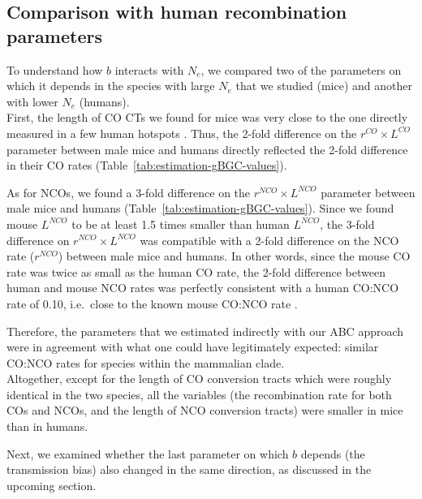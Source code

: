 \subsection{Comparison with human recombination parameters}

To understand how $b$ interacts with $N_e$, we compared two of the parameters on which it depends in the species with large $N_e$ that we studied (mice) and another with lower $N_e$ (humans).\\

First, the length of CO CTs we found for mice was very close to the one directly measured in a few human hotspots \citep{jeffreys2004intense}.
Thus, the 2-fold difference on the $r^{CO} \times L^{CO}$ parameter between male mice and humans directly reflected the 2-fold difference in their CO rates (Table~\ref{tab:estimation-gBGC-values}).


As for NCOs, we found a 3-fold difference on the $r^{NCO} \times L^{NCO}$ parameter between male mice and humans (Table~\ref{tab:estimation-gBGC-values}).
Since we found mouse $L^{NCO}$ to be at least 1.5 times smaller than human $L^{NCO}$, the 3-fold difference on $r^{NCO} \times L^{NCO}$ was compatible with a 2-fold difference on the NCO rate ($r^{NCO}$) between male mice and humans. 
In other words, since the mouse CO rate was twice as small as the human CO rate, the 2-fold difference between human and mouse NCO rates was perfectly consistent with a human CO:NCO rate of 0.10, i.e.\ close to the known mouse CO:NCO rate \citep{cole2010comprehensive}.

Therefore, the parameters that we estimated indirectly with our ABC approach were in agreement with what one could have legitimately expected: similar CO:NCO rates for species within the mammalian clade.\\


Altogether, except for the length of CO conversion tracts which were roughly identical in the two species, all the variables (the recombination rate for both COs and NCOs, and the length of NCO conversion tracts) were smaller in mice than in humans.

Next, we examined whether the last parameter on which $b$ depends (the transmission bias) also changed in the same direction, as discussed in the upcoming section.





